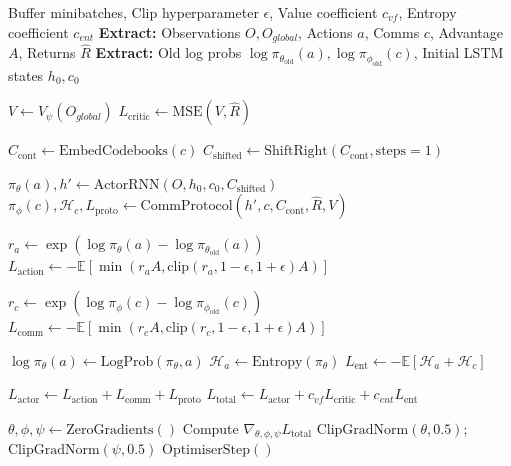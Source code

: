 \label{sec:mappo}

\begin{algorithm}
    \caption{MAPPO Minibatch Update.}
    \label{alg:mappo}
    \begin{algorithmic}[1]
    \Require Buffer minibatches, Clip hyperparameter $\epsilon$, Value coefficient $c_{vf}$, Entropy coefficient $c_{ent}$
        \State \textbf{Extract:} Observations $O, O_{global}$, Actions $a$, Comms $c$, Advantage $A$, Returns $\hat{R}$
        \State \textbf{Extract:} Old log probs $\log \pi_{\theta_{\text{old}}}(a), \log \pi_{\phi_{\text{old}}}(c)$, Initial LSTM states $h_0, c_0$
        
        \State {}
        \State $V \gets V_{\psi}(O_{global})$ 
        \State $L_{\text{critic}} \gets \text{MSE}(V, \hat{R})$
        
        \State {}
        \State $C_{\text{cont}} \gets \text{EmbedCodebooks}(c)$ 
        \State $C_{\text{shifted}} \gets \text{ShiftRight}(C_{\text{cont}}, \text{steps}=1)$ 
        
        \State {}
        \State $\pi_{\theta}(a), h' \gets \text{ActorRNN}(O, h_0, c_0, C_{\text{shifted}})$
        \State $\pi_{\phi}(c), \mathcal{H}_c, L_{\text{proto}} \gets \text{CommProtocol}(h', c, C_{\text{cont}}, \hat{R}, V)$
            
        \State {}
        \State $r_a \gets \exp(\log \pi_{\theta}(a) - \log \pi_{\theta_{\text{old}}}(a))$
        \State $L_{\text{action}} \gets -\mathbb{E}\left[ \min \left( r_a A, \text{clip}(r_a, 1-\epsilon, 1+\epsilon) A \right) \right]$
        
        \State {}
        \State $r_c \gets \exp(\log \pi_{\phi}(c) - \log \pi_{\phi_{\text{old}}}(c))$
        \State $L_{\text{comm}} \gets -\mathbb{E}\left[ \min \left( r_c A, \text{clip}(r_c, 1-\epsilon, 1+\epsilon) A \right) \right]$

        \State {}
        \State $\log \pi_{\theta}(a) \gets \text{LogProb}(\pi_{\theta}, a)$
        \State $\mathcal{H}_a \gets \text{Entropy}(\pi_{\theta})$
        \State $L_{\text{ent}} \gets - \mathbb{E}[\mathcal{H}_a + \mathcal{H}_c]$
        
        \State {}
        \State $L_{\text{actor}} \gets L_{\text{action}} + L_{\text{comm}} + L_{\text{proto}}$
        \State $L_{\text{total}} \gets L_{\text{actor}} + c_{vf} L_{\text{critic}} + c_{ent} L_{\text{ent}}$
        
        \State {}
        \State $\theta, \phi, \psi \gets \text{ZeroGradients}()$
        \State Compute $\nabla_{\theta, \phi, \psi} L_{\text{total}}$
        \State $\text{ClipGradNorm}(\theta, 0.5)$; $\text{ClipGradNorm}(\psi, 0.5)$
        \State $\text{OptimiserStep}()$
    \EndFor
    \end{algorithmic}
\end{algorithm}
